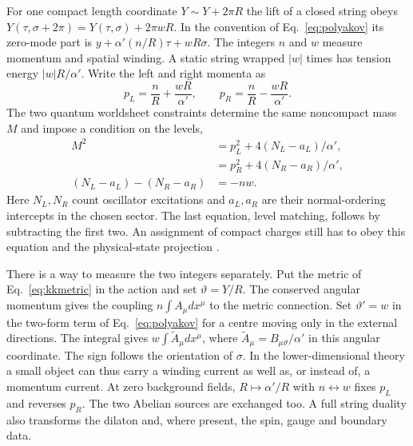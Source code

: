 \documentclass[10pt]{article}
\begin{document}
For one compact length coordinate $Y\sim Y+2\pi R$ the lift of a closed string obeys $Y(\tau,\sigma+2\pi)=Y(\tau,\sigma)+2\pi wR$. In the convention of Eq.~\eqref{eq:polyakov} its zero-mode part is $y+\alpha'(n/R)\tau+wR\sigma$. The integers $n$ and $w$ measure momentum and spatial winding. A static string wrapped $|w|$ times has tension energy $|w|R/\alpha'$. Write the left and right momenta as
\begin{equation}
 p_L=\frac nR+\frac{wR}{\alpha'},\qquad
 p_R=\frac nR-\frac{wR}{\alpha'} .
\end{equation}
The two quantum worldsheet constraints determine the same noncompact mass $M$ and impose a condition on the levels,
\begin{equation}
\begin{aligned}
 M^2 &=p_L^2+4(N_L-a_L)/\alpha',\\
     &=p_R^2+4(N_R-a_R)/\alpha',\\
 (N_L-a_L)-(N_R-a_R)&=-nw .
\end{aligned}
 \label{eq:shell}
\end{equation}
Here $N_L,N_R$ count oscillator excitations and $a_L,a_R$ are their normal-ordering intercepts in the chosen sector. The last equation, level matching, follows by subtracting the first two. An assignment of compact charges still has to obey this equation and the physical-state projection \cite{Polchinski1998String,Tong2009String}.

There is a way to measure the two integers separately. Put the metric of Eq.~\eqref{eq:kkmetric} in the action and set $\vartheta=Y/R$. The conserved angular momentum gives the coupling $n\int A_\mu dx^\mu$ to the metric connection. Set $\vartheta'=w$ in the two-form term of Eq.~\eqref{eq:polyakov} for a centre moving only in the external directions. The integral gives $w\int\widetilde A_\mu dx^\mu$, where $\widetilde A_\mu=B_{\mu\vartheta}/\alpha'$ in this angular coordinate. The sign follows the orientation of $\sigma$. In the lower-dimensional theory a small object can thus carry a winding current as well as, or instead of, a momentum current. At zero background fields, $R\mapsto\alpha'/R$ with $n\leftrightarrow w$ fixes $p_L$ and reverses $p_R$. The two Abelian sources are exchanged too. A full string duality also transforms the dilaton and, where present, the spin, gauge and boundary data.
\end{document}
